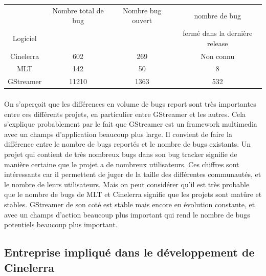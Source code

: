 \begin{center}

  \begin{tabular}{ | c | c | c | c|}

    \hline

         & Nombre total de bug & Nombre bug ouvert & nombre de bug \\

Logiciel &        & & fermé dans la dernière release \\

\hline \hline

Cinelerra & 602 & 269 & Non connu \\

\hline

MLT\index{MLT} & 142 & 50 & 8 \\

\hline

GStreamer & 11210 & 1363 &  532\\

\hline

  \end{tabular}

\end{center}

\paragraph{}

On s'aperçoit que les différences en volume de bugs report sont très
importantes entre ces différents projets, en particulier entre GStreamer
et les autres. Cela s'explique probablement par le fait que GStreamer
est un framework multimedia avec un champs d'application beaucoup
plus large. Il convient de faire la différence entre le nombre de bugs
reportés et le nombre de bugs existants. Un projet qui contient de très
nombreux bugs dans son bug tracker signifie de manière certaine que le
projet a de nombreux utilisateurs. Ces chiffres sont intéressants car
il permettent de juger de la taille des différentes communautés, et le
nombre de leurs utilisateurs. Mais on peut considérer qu'il est très
probable que le nombre de bugs de MLT et Cinelerra signifie
que les projets sont matûre et stables. GStreamer de son coté est
stable mais encore en évolution constante, et avec un champs d'action
beaucoup plus important qui rend le nombre de bugs potentiels beaucoup
plus important.

\subsection {Entreprise impliqué dans le développement de Cinelerra}

